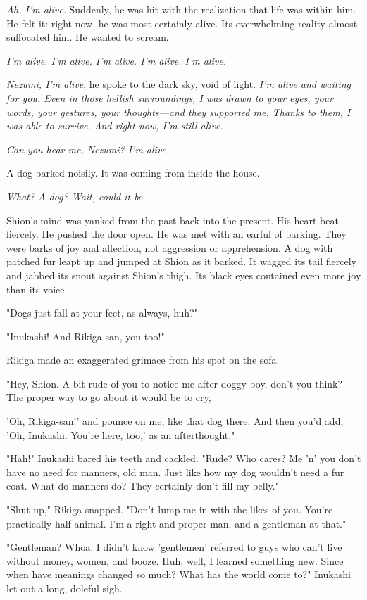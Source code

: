\emph{Ah, I'm alive.} Suddenly, he was hit with the realization that life was
within him. He felt it: right now, he was most certainly alive. Its
overwhelming reality almost suffocated him. He wanted to scream.

\emph{I'm alive. I'm alive. I'm alive. I'm alive. I'm alive.}

\emph{Nezumi, I'm alive}, he spoke to the dark sky, void of light. \emph{I'm alive
and waiting for you. Even in those hellish surroundings, I was drawn to
your eyes, your words, your gestures, your thoughts---and they supported
me. Thanks to them, I was able to survive. And right now, I'm still
alive.}

\emph{Can you hear me, Nezumi? I'm alive.}

A dog barked noisily. It was coming from inside the house.

\emph{What? A dog? Wait, could it be---}

Shion's mind was yanked from the past back into the present. His heart
beat fiercely. He pushed the door open. He was met with an earful of
barking. They were barks of joy and affection, not aggression or
apprehension. A dog with patched fur leapt up and jumped at Shion as it
barked. It wagged its tail fiercely and jabbed its snout against Shion's
thigh. Its black eyes contained even more joy than its voice.

"Dogs just fall at your feet, as always, huh?"

"Inukashi! And Rikiga-san, you too!"

Rikiga made an exaggerated grimace from his spot on the sofa.~

"Hey, Shion. A bit rude of you to notice me after doggy-boy, don't you
think? The proper way to go about it would be to cry,~

'Oh, Rikiga-san!' and pounce on me, like that dog there. And then you'd
add, 'Oh, Inukashi. You're here, too,' as an afterthought."

"Hah!" Inukashi bared his teeth and cackled. "Rude? Who cares? Me 'n'
you don't have no need for manners, old man. Just like how my dog
wouldn't need a fur coat. What do manners do? They certainly don't fill
my belly."

"Shut up," Rikiga snapped. "Don't lump me in with the likes of you.
You're practically half-animal. I'm a right and proper man, and a
gentleman at that."

"Gentleman? Whoa, I didn't know 'gentlemen' referred to guys who can't
live without money, women, and booze. Huh, well, I learned something
new. Since when have meanings changed so much? What has the world come
to?" Inukashi let out a long, doleful sigh.

